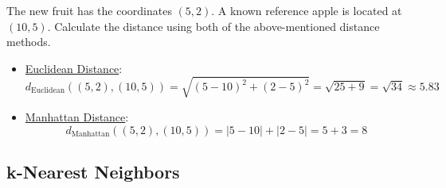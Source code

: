 \begin{ejercicio}
    The new fruit has the coordinates $(5, 2)$. A known reference apple is located at $(10, 5)$. Calculate the distance using both of the above-mentioned distance methods.
    \begin{itemize}
        \item \ul{Euclidean Distance}:
        \begin{equation*}
            d_{\text{Euclidean}}((5, 2), (10, 5)) = \sqrt{(5 - 10)^2 + (2 - 5)^2} = \sqrt{25 + 9} = \sqrt{34} \approx 5.83
        \end{equation*}
        \item \ul{Manhattan Distance}:
        \begin{equation*}
            d_{\text{Manhattan}}((5, 2), (10, 5)) = |5 - 10| + |2 - 5| = 5 + 3 = 8
        \end{equation*}
    \end{itemize}
\end{ejercicio}

\subsection*{k-Nearest Neighbors}

